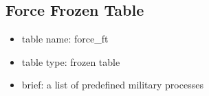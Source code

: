 \documentclass[a4paper,oneside,titlepage]{report}
\begin{document}
\begin{longtable}{ |c|l| }
  \end{longtable}
 
\subsection{Force Frozen Table}
\begin{itemize}
  \setlength{\itemsep}{0pt}
  \setlength{\parskip}{0pt}
\item table name: force\_ft  
\item table type: frozen table   
\item brief: a list of predefined military processes
\end{itemize}
\label{force_ft}
\end{document}
